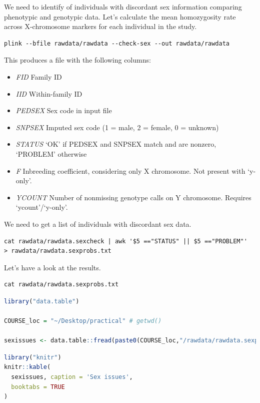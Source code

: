 \documentclass[
]{book}
\providecommand{\tightlist}{%
  \setlength{\itemsep}{0pt}\setlength{\parskip}{0pt}}
\begin{document}
We need to identify of individuals with discordant sex information comparing phenotypic and genotypic data. Let's calculate the mean homozygosity rate across X-chromosome markers for each individual in the study.

\begin{lstlisting}
plink --bfile rawdata/rawdata --check-sex --out rawdata/rawdata
\end{lstlisting}

This produces a file with the following columns:

\begin{itemize}
\tightlist
\item
  \emph{FID} Family ID
\item
  \emph{IID} Within-family ID
\item
  \emph{PEDSEX} Sex code in input file
\item
  \emph{SNPSEX} Imputed sex code (1 = male, 2 = female, 0 = unknown)
\item
  \emph{STATUS} `OK' if PEDSEX and SNPSEX match and are nonzero, `PROBLEM' otherwise
\item
  \emph{F} Inbreeding coefficient, considering only X chromosome. Not present with `y-only'.
\item
  \emph{YCOUNT} Number of nonmissing genotype calls on Y chromosome. Requires `ycount'/`y-only'.
\end{itemize}

We need to get a list of individuals with discordant sex data.

\begin{lstlisting}
cat rawdata/rawdata.sexcheck | awk '$5 =="STATUS" || $5 =="PROBLEM"'  > rawdata/rawdata.sexprobs.txt
\end{lstlisting}

Let's have a look at the results.

\begin{lstlisting}
cat rawdata/rawdata.sexprobs.txt
\end{lstlisting}

\begin{lstlisting}[language=R]
library("data.table")

COURSE_loc = "~/Desktop/practical" # getwd()

sexissues <- data.table::fread(paste0(COURSE_loc,"/rawdata/rawdata.sexprobs.txt"))
\end{lstlisting}

\begin{lstlisting}[language=R]
library("knitr")
knitr::kable(
  sexissues, caption = 'Sex issues',
  booktabs = TRUE
)
\end{lstlisting}
\end{document}
